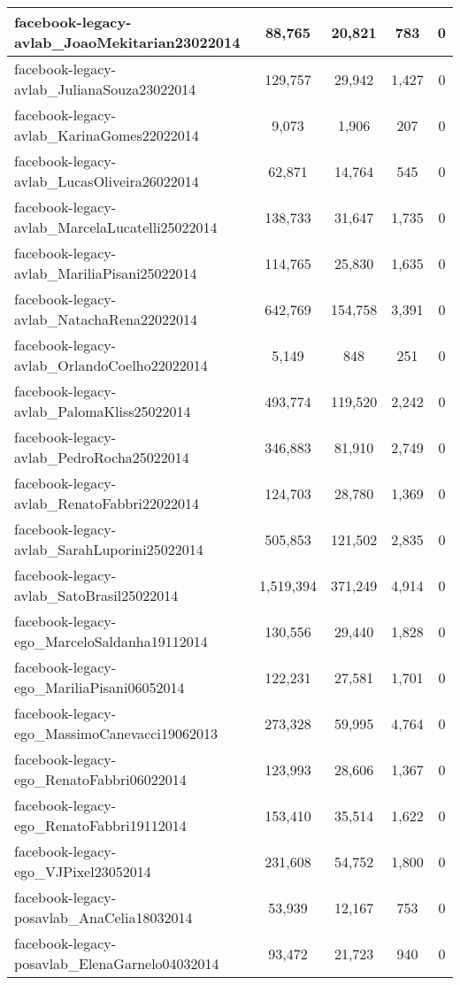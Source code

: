 \begin{center}
\begin{longtable}{| l | c | c | c | c |}
facebook-legacy-avlab\_JoaoMekitarian23022014 & 88,765  & 20,821  & 783  & 0 \\\hline
facebook-legacy-avlab\_JulianaSouza23022014 & 129,757  & 29,942  & 1,427  & 0 \\\hline
facebook-legacy-avlab\_KarinaGomes22022014 & 9,073  & 1,906  & 207  & 0 \\\hline
facebook-legacy-avlab\_LucasOliveira26022014 & 62,871  & 14,764  & 545  & 0 \\\hline
facebook-legacy-avlab\_MarcelaLucatelli25022014 & 138,733  & 31,647  & 1,735  & 0 \\\hline
facebook-legacy-avlab\_MariliaPisani25022014 & 114,765  & 25,830  & 1,635  & 0 \\\hline
facebook-legacy-avlab\_NatachaRena22022014 & 642,769  & 154,758  & 3,391  & 0 \\\hline
facebook-legacy-avlab\_OrlandoCoelho22022014 & 5,149  & 848  & 251  & 0 \\\hline
facebook-legacy-avlab\_PalomaKliss25022014 & 493,774  & 119,520  & 2,242  & 0 \\\hline
facebook-legacy-avlab\_PedroRocha25022014 & 346,883  & 81,910  & 2,749  & 0 \\\hline
facebook-legacy-avlab\_RenatoFabbri22022014 & 124,703  & 28,780  & 1,369  & 0 \\\hline
facebook-legacy-avlab\_SarahLuporini25022014 & 505,853  & 121,502  & 2,835  & 0 \\\hline
facebook-legacy-avlab\_SatoBrasil25022014 & 1,519,394  & 371,249  & 4,914  & 0 \\\hline
facebook-legacy-ego\_MarceloSaldanha19112014 & 130,556  & 29,440  & 1,828  & 0 \\\hline
facebook-legacy-ego\_MariliaPisani06052014 & 122,231  & 27,581  & 1,701  & 0 \\\hline
facebook-legacy-ego\_MassimoCanevacci19062013 & 273,328  & 59,995  & 4,764  & 0 \\\hline
facebook-legacy-ego\_RenatoFabbri06022014 & 123,993  & 28,606  & 1,367  & 0 \\\hline
facebook-legacy-ego\_RenatoFabbri19112014 & 153,410  & 35,514  & 1,622  & 0 \\\hline
facebook-legacy-ego\_VJPixel23052014 & 231,608  & 54,752  & 1,800  & 0 \\\hline
facebook-legacy-posavlab\_AnaCelia18032014 & 53,939  & 12,167  & 753  & 0 \\\hline
facebook-legacy-posavlab\_ElenaGarnelo04032014 & 93,472  & 21,723  & 940  & 0 \\\hline

\end{longtable}
\end{center}

